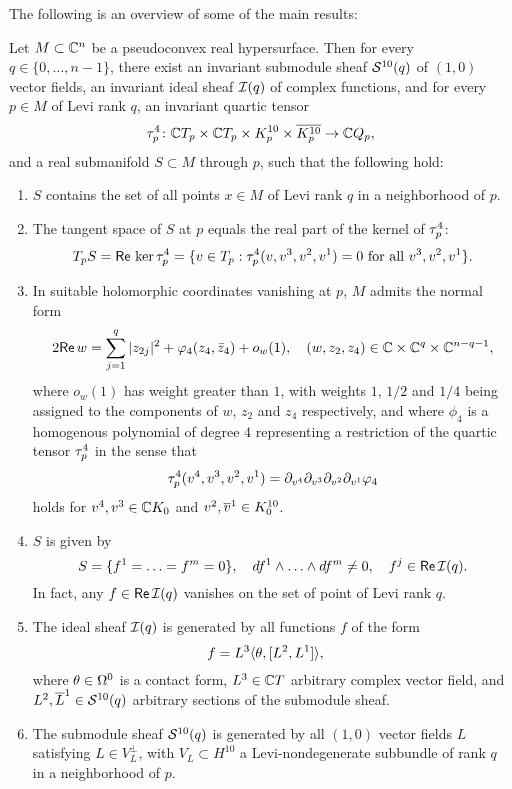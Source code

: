 \documentclass[12pt]{amsart}
\begin{document}
\bigskip
The following is an overview of some of the main results:


\bt{}
Let $M\subset{{\mathbb{C}}^n}$ be a pseudoconvex real hypersurface.
Then for every $q\in \{0, \ldots, n-1\}$, there exist 
an invariant submodule sheaf ${\mathcal{S}}^{10}(q)$ of $(1,0)$ vector fields,
an invariant ideal sheaf ${\mathcal{I}}(q)$ of complex functions,
and for every $p\in M$ of Levi rank $q$,
an invariant quartic tensor
$$
	\tau^4_p \colon  {\mathbb{C}} T_p \times {\mathbb{C}} T_p 
	\times K^{10}_p\times \overline{K^{10}_p} \to {\mathbb{C}} Q_p,
$$
and
a real submanifold $S\subset M$ through $p$,
such that the following hold:

\begin{enumerate}

\item 
$S$ contains the set of all points $x\in M$ of Levi rank $q$
in a neighborhood of $p$.

\item
The tangent space of $S$ at $p$ equals the real part of the kernel of $\tau^4_p$:
$$
	T_p S = {\sf Re}\,\ker \tau^4_p = \{ v\in T_p :  \tau^4_p(v, v^3, v^2, v^1) = 0 
	\text{ for all } v^3, v^2, v^1 \}.
$$


\item
In suitable holomorphic coordinates vanishing at $p$,
$M$ admits the normal form
$$
	2{\sf Re}\, w = \sum_{j=1}^q |z_{2j}|^2 + \varphi_4(z_4,{\bar z}_4) + o_w(1),
	\quad
	(w, z_2, z_4)\in {\mathbb{C}}\times {\mathbb{C}}^{q}\times {\mathbb{C}}^{n-q-1},
$$
where $o_w(1)$ has weight greater than $1$,
with weights $1$, $1/2$ and $1/4$ being assigned to
the components of $w$, $z_2$ and $z_4$ respectively,
and 
where $\phi_4$ is a homogenous polynomial of degree $4$
representing a restriction of the quartic tensor $\tau^4_p$ in the sense that
$$
	\tau^4_p(v^4, v^3, v^2, v^1) 
	= \partial_{v^4} \partial_{v^3} \partial_{v^2} \partial_{v^1} \varphi_4
$$
holds for $v^4, v^3\in {\mathbb{C}} K_0$
and
$v^2, \overline{v}^1\in K^{10}_0$.

\item
$S$ is given by 
$$
	S = \{f^1 = \ldots = f^m =0\},
	\quad
	df^1\wedge \ldots \wedge df^m \ne 0,
	\quad
	f^j \in {\sf Re}\, {\mathcal{I}}(q).
$$
In fact, any $f\in {\sf Re}\, {\mathcal{I}}(q)$ vanishes
on the set of point of Levi rank $q$. 

\item
The ideal sheaf ${\mathcal{I}}(q)$
is generated by all functions $f$ of the form
$$
	f = L^3 \langle \theta, [L^2, L^1] \rangle,
	\quad 
$$
where $\theta\in\Omega^0$ is a contact form, 
$L^3\in {\mathbb{C}} T$ arbitrary complex vector field,
and $L^2, \overline{L}^1 \in {\mathcal{S}}^{10}(q)$
arbitrary sections of the submodule sheaf.

\item
The submodule sheaf ${\mathcal{S}}^{10}(q)$
is generated by all $(1,0)$ vector fields $L$
satisfying $L\in V_L^\perp$,
with $V_L\subset H^{10}$
a Levi-nondegenerate subbundle
of rank $q$ in a neighborhood of $p$.

\end{enumerate}
\end{document}
